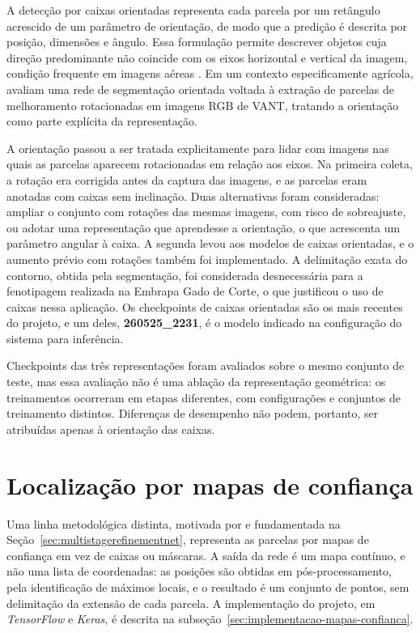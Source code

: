 A detec\c{c}\~ao por caixas orientadas representa cada parcela por um ret\^angulo acrescido de um par\^ametro de orienta\c{c}\~ao, de modo que a predi\c{c}\~ao \'e descrita por posi\c{c}\~ao, dimens\~oes e \^angulo. Essa formula\c{c}\~ao permite descrever objetos cuja dire\c{c}\~ao predominante n\~ao coincide com os eixos horizontal e vertical da imagem, condi\c{c}\~ao frequente em imagens a\'ereas \citep{ding2019,ding2022}. Em um contexto especificamente agr\'icola, \citet{zhang2025} avaliam uma rede de segmenta\c{c}\~ao orientada voltada \`a extra\c{c}\~ao de parcelas de melhoramento rotacionadas em imagens RGB de VANT, tratando a orienta\c{c}\~ao como parte expl\'icita da representa\c{c}\~ao.

A orienta\c{c}\~ao passou a ser tratada explicitamente para lidar com imagens nas quais as parcelas aparecem rotacionadas em rela\c{c}\~ao aos eixos. Na primeira coleta, a rota\c{c}\~ao era corrigida antes da captura das imagens, e as parcelas eram anotadas com caixas sem inclina\c{c}\~ao. Duas alternativas foram consideradas: ampliar o conjunto com rota\c{c}\~oes das mesmas imagens, com risco de sobreajuste, ou adotar uma representa\c{c}\~ao que aprendesse a orienta\c{c}\~ao, o que acrescenta um par\^ametro angular \`a caixa. A segunda levou aos modelos de caixas orientadas, e o aumento pr\'evio com rota\c{c}\~oes tamb\'em foi implementado. A delimita\c{c}\~ao exata do contorno, obtida pela segmenta\c{c}\~ao, foi considerada desnecess\'aria para a fenotipagem realizada na Embrapa Gado de Corte, o que justificou o uso de caixas nessa aplica\c{c}\~ao. Os checkpoints de caixas orientadas s\~ao os mais recentes do projeto, e um deles, \textbf{260525\_2231}, \'e o modelo indicado na configura\c{c}\~ao do sistema para infer\^encia.

Checkpoints das tr\^es representa\c{c}\~oes foram avaliados sobre o mesmo conjunto de teste, mas essa avalia\c{c}\~ao n\~ao \'e uma abla\c{c}\~ao da representa\c{c}\~ao geom\'etrica: os treinamentos ocorreram em etapas diferentes, com configura\c{c}\~oes e conjuntos de treinamento distintos. Diferen\c{c}as de desempenho n\~ao podem, portanto, ser atribu\'idas apenas \`a orienta\c{c}\~ao das caixas.

\section{Localiza\c{c}\~ao por mapas de confian\c{c}a}
\label{sec:localizacao-mapas-confianca}

Uma linha metodol\'ogica distinta, motivada por \citet{arruda2022} e fundamentada na Se\c{c}\~ao~\ref{sec:multistagerefinementnet}, representa as parcelas por mapas de confian\c{c}a em vez de caixas ou m\'ascaras. A sa\'ida da rede \'e um mapa cont\'inuo, e n\~ao uma lista de coordenadas: as posi\c{c}\~oes s\~ao obtidas em p\'os-processamento, pela identifica\c{c}\~ao de m\'aximos locais, e o resultado \'e um conjunto de pontos, sem delimita\c{c}\~ao da extens\~ao de cada parcela. A implementa\c{c}\~ao do projeto, em \textit{TensorFlow} e \textit{Keras}, \'e descrita na subse\c{c}\~ao~\ref{sec:implementacao-mapas-confianca}.


